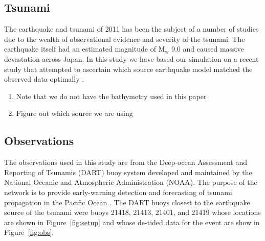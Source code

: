 \subsection{\tohoku Tsunami}

The \tohoku earthquake and tsunami of 2011 has been the subject of a number of studies due to the wealth of observational evidence and severity of the tsunami.  The earthquake itself had an estimated magnitude of $\text{M}_\text{w}$ 9.0 and caused massive devastation across Japan.  In this study we have based our simulation on a recent study that attempted to ascertain which source earthquake model matched the observed data optimally \cite{MacInnes:2013cr}.  

\begin{enumerate}
    \item Note that we do not have the bathymetry used in this paper
    \item Figure out which source we are using
\end{enumerate}

\subsection{Observations}

The observations used in this study are from the Deep-ocean Assessment and Reporting of Tsunamis (DART) buoy system developed and maintained by the National Oceanic and Atmospheric Administration (NOAA).  The purpose of the network is to provide early-warning detection and forecasting of tsunami propagation in the Pacific Ocean \cite{Percival:2011}.  The DART buoys closest to the earthquake source of the \tohoku tsunami were buoys 21418, 21413, 21401, and 21419 whose locations are shown in Figure~\ref{fig:setup} and whose de-tided data for the event are show in Figure~\ref{fig:obs}.


